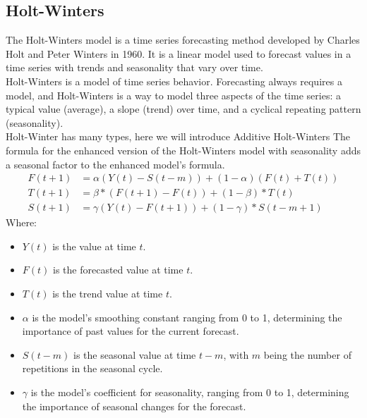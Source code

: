 \documentclass{ieeeojies}
\begin{document}
	\subsection{Holt-Winters}
	The Holt-Winters model is a time series forecasting method developed by Charles Holt and Peter Winters in 1960. It is a linear model used to forecast values in a time series with trends and seasonality that vary over time.\\
	Holt-Winters is a model of time series behavior. Forecasting always requires a model, and Holt-Winters is a way to model three aspects of the time series: a typical value (average), a slope (trend) over time, and a cyclical repeating pattern (seasonality). \cite{b9}\\
	Holt-Winter has many types, here we will introduce Additive Holt-Winters
	The formula for the enhanced version of the Holt-Winters model with seasonality adds a seasonal factor to the enhanced model's formula.
	\begin{align*}
		F(t+1) &= \alpha(Y(t) - S(t-m)) + (1-\alpha)(F(t) + T(t)) \\
		T(t+1) &= \beta*(F(t+1)-F(t)) + (1-\beta)*T(t) \\
		S(t+1) &= \gamma(Y(t) - F(t+1)) + (1-\gamma)*S(t-m+1)
	\end{align*}
	Where:
	\begin{itemize}
            \item \( Y(t) \) is the value at time \( t \).
		\item \( F(t) \) is the forecasted value at time \( t \).
		\item \( T(t) \) is the trend value at time \( t \).
		\item \( \alpha \) is the model's smoothing constant ranging from 0 to 1, determining the importance of past values for the current forecast.
		\item \( S(t-m) \) is the seasonal value at time \( t-m \), with \( m \) being the number of repetitions in the seasonal cycle.
		\item \( \gamma \) is the model's coefficient for seasonality, ranging from 0 to 1, determining the importance of seasonal changes for the forecast.
	\end{itemize}
	
\end{document}
